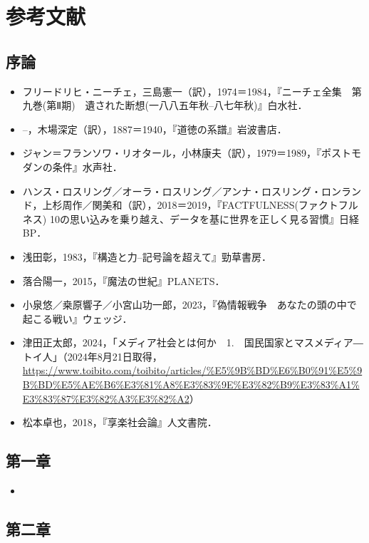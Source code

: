\section{参考文献}\label{ux53c2ux8003ux6587ux732e}

\subsection{序論}\label{ux5e8fux8ad6}

\begin{itemize}
\tightlist
\item
  フリードリヒ・ニーチェ，三島憲一（訳），1974＝1984，『ニーチェ全集　第九巻(第Ⅱ期)　遺された断想(一八八五年秋--八七年秋)』白水社．
\item
  --，木場深定（訳），1887＝1940，『道徳の系譜』岩波書店．
\item
  ジャン＝フランソワ・リオタール，小林康夫（訳），1979＝1989，『ポストモダンの条件』水声社．
\item
  ハンス・ロスリング／オーラ・ロスリング／アンナ・ロスリング・ロンランド，上杉周作／関美和（訳），2018＝2019，『FACTFULNESS(ファクトフルネス)
  10の思い込みを乗り越え、データを基に世界を正しく見る習慣』日経BP．
\item
  浅田彰，1983，『構造と力--記号論を超えて』勁草書房．
\item
  落合陽一，2015，『魔法の世紀』PLANETS．
\item
  小泉悠／桒原響子／小宮山功一郎，2023，『偽情報戦争　あなたの頭の中で起こる戦い』ウェッジ．
\item
  津田正太郎，2024，「メディア社会とは何か　1.　国民国家とマスメディア―トイ人」（2024年8月21日取得，\url{https://www.toibito.com/toibito/articles/\%E5\%9B\%BD\%E6\%B0\%91\%E5\%9B\%BD\%E5\%AE\%B6\%E3\%81\%A8\%E3\%83\%9E\%E3\%82\%B9\%E3\%83\%A1\%E3\%83\%87\%E3\%82\%A3\%E3\%82\%A2}）
\item
  松本卓也，2018，『享楽社会論』人文書院．
\end{itemize}

\subsection{第一章}\label{ux7b2cux4e00ux7ae0}

\begin{itemize}
\tightlist
\item
\end{itemize}

\subsection{第二章}\label{ux7b2cux4e8cux7ae0}

